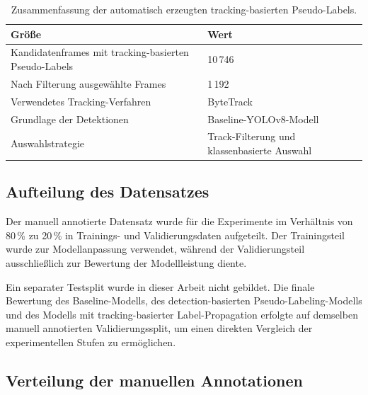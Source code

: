 \begin{table}[H]
    \centering
    \caption{Zusammenfassung der automatisch erzeugten tracking-basierten
        Pseudo-Labels.}
    \label{tab:anhang_tracking_summary}
    \begin{tabular}{p{7.5cm}p{5.5cm}}
        \toprule
        \textbf{Größe}                                        & \textbf{Wert}                               \\
        \midrule
        Kandidatenframes mit tracking-basierten Pseudo-Labels & 10\,746                                     \\
        Nach Filterung ausgewählte Frames                     & 1\,192                                      \\
        Verwendetes Tracking-Verfahren                        & ByteTrack                                   \\
        Grundlage der Detektionen                             & Baseline-YOLOv8-Modell                      \\
        Auswahlstrategie                                      & Track-Filterung und klassenbasierte Auswahl \\
        \bottomrule
    \end{tabular}
\end{table}

\subsection{Aufteilung des Datensatzes}

Der manuell annotierte Datensatz wurde für die Experimente im Verhältnis
von 80\,\% zu 20\,\% in Trainings- und Validierungsdaten aufgeteilt.
Der Trainingsteil wurde zur Modellanpassung verwendet, während der
Validierungsteil ausschließlich zur Bewertung der Modellleistung diente.

Ein separater Testsplit wurde in dieser Arbeit nicht gebildet. Die finale
Bewertung des Baseline-Modells, des detection-basierten
Pseudo-Labeling-Modells und des Modells mit tracking-basierter
Label-Propagation erfolgte auf demselben manuell annotierten
Validierungssplit, um einen direkten Vergleich der experimentellen
Stufen zu ermöglichen.

\subsection{Verteilung der manuellen Annotationen}

